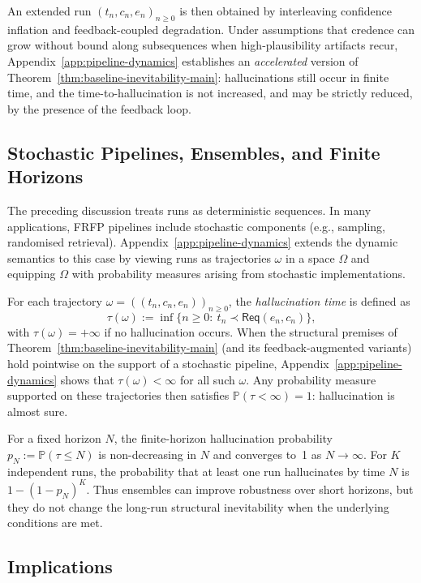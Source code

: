 \documentclass[11pt]{article}
\theoremstyle{definition}
\newcommand{\Req}{\mathsf{Req}}
\begin{document}
An extended run \((t_n,c_n,e_n)_{n\ge 0}\) is then obtained by
interleaving confidence inflation and feedback-coupled degradation. Under
assumptions that credence can grow without bound along subsequences when
high-plausibility artifacts recur, Appendix~\ref{app:pipeline-dynamics}
establishes an \emph{accelerated} version of
Theorem~\ref{thm:baseline-inevitability-main}: hallucinations still
occur in finite time, and the time-to-hallucination is not increased,
and may be strictly reduced, by the presence of the feedback loop.

\subsection{Stochastic Pipelines, Ensembles, and Finite Horizons}

The preceding discussion treats runs as deterministic sequences. In many
applications, FRFP pipelines include stochastic components (e.g.,
sampling, randomised retrieval). Appendix~\ref{app:pipeline-dynamics}
extends the dynamic semantics to this case by viewing runs as
trajectories \(\omega\) in a space \(\Omega\) and equipping \(\Omega\)
with probability measures arising from stochastic implementations.

For each trajectory \(\omega = ((t_n,c_n,e_n))_{n\ge 0}\), the
\emph{hallucination time} is defined as
\[
\tau(\omega)
 :=
\inf\{n\ge 0:\ t_n \prec \Req(e_n,c_n)\},
\]
with \(\tau(\omega)=+\infty\) if no hallucination occurs. When the
structural premises of Theorem~\ref{thm:baseline-inevitability-main}
(and its feedback-augmented variants) hold pointwise on the support of a
stochastic pipeline, Appendix~\ref{app:pipeline-dynamics} shows that
\(\tau(\omega)<\infty\) for all such \(\omega\). Any probability measure
supported on these trajectories then satisfies
\(\mathbb{P}(\tau<\infty)=1\): hallucination is almost sure.

For a fixed horizon \(N\), the finite-horizon hallucination probability
\(p_N:=\mathbb{P}(\tau\le N)\) is non-decreasing in \(N\) and converges
to~1 as \(N\to\infty\). For \(K\) independent runs, the probability that
at least one run hallucinates by time \(N\) is
\(1-(1-p_N)^K\). Thus ensembles can improve robustness over short
horizons, but they do not change the long-run structural inevitability
when the underlying conditions are met.

\subsection{Implications}
\end{document}
